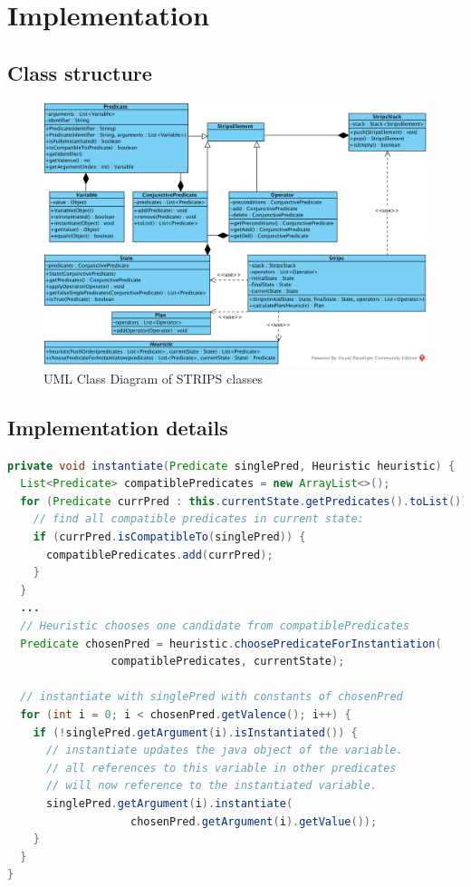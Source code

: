 \section{Implementation}


\subsection{Class structure}

\begin{figure}[hbt]
  \includegraphics[width=1.1\textwidth]{uml/CD1}
  \caption{UML Class Diagram of STRIPS classes}
\end{figure}


\subsection{Implementation details}

\begin{lstlisting}[language=Java, caption=Strips method  \textit{instantiate}]
private void instantiate(Predicate singlePred, Heuristic heuristic) {
  List<Predicate> compatiblePredicates = new ArrayList<>();
  for (Predicate currPred : this.currentState.getPredicates().toList()) {
    // find all compatible predicates in current state:
    if (currPred.isCompatibleTo(singlePred)) {
      compatiblePredicates.add(currPred);
    }
  }
  ... 
  // Heuristic chooses one candidate from compatiblePredicates
  Predicate chosenPred = heuristic.choosePredicateForInstantiation(
				compatiblePredicates, currentState);
				
  // instantiate with singlePred with constants of chosenPred
  for (int i = 0; i < chosenPred.getValence(); i++) {
    if (!singlePred.getArgument(i).isInstantiated()) {
      // instantiate updates the java object of the variable.
      // all references to this variable in other predicates
      // will now reference to the instantiated variable.
      singlePred.getArgument(i).instantiate(
                   chosenPred.getArgument(i).getValue());
    }
  } 
}
\end{lstlisting}
